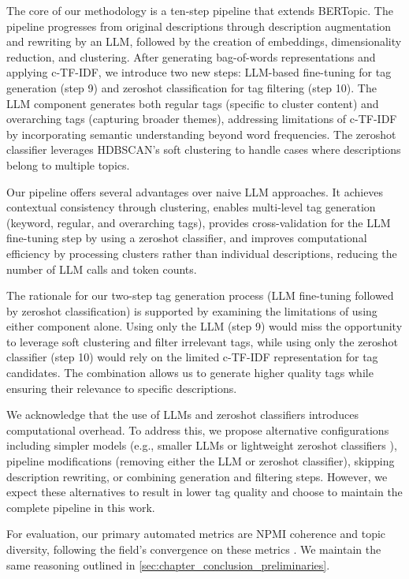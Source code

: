 The core of our methodology is a ten-step pipeline that extends BERTopic. The pipeline progresses from original descriptions through description augmentation and rewriting by an LLM, followed by the creation of embeddings, dimensionality reduction, and clustering. After generating bag-of-words representations and applying c-TF-IDF, we introduce two new steps: LLM-based fine-tuning for tag generation (step 9) and zeroshot classification for tag filtering (step 10). The LLM component generates both regular tags (specific to cluster content) and overarching tags (capturing broader themes), addressing limitations of c-TF-IDF by incorporating semantic understanding beyond word frequencies. The zeroshot classifier leverages HDBSCAN's soft clustering to handle cases where descriptions belong to multiple topics.

Our pipeline offers several advantages over naive LLM approaches. It achieves contextual consistency through clustering, enables multi-level tag generation (keyword, regular, and overarching tags), provides cross-validation for the LLM fine-tuning step by using a zeroshot classifier, and improves computational efficiency by processing clusters rather than individual descriptions, reducing the number of LLM calls and token counts.

The rationale for our two-step tag generation process (LLM fine-tuning followed by zeroshot classification) is supported by examining the limitations of using either component alone. Using only the LLM (step 9) would miss the opportunity to leverage soft clustering and filter irrelevant tags, while using only the zeroshot classifier (step 10) would rely on the limited c-TF-IDF representation for tag candidates. The combination allows us to generate higher quality tags while ensuring their relevance to specific descriptions.

We acknowledge that the use of LLMs and zeroshot classifiers introduces computational overhead. To address this, we propose alternative configurations including simpler models (e.g., smaller LLMs or lightweight zeroshot classifiers \cite{noauthor_moritzlaurerdeberta-v3-large-zeroshot-v20_2024}), pipeline modifications (removing either the LLM or zeroshot classifier), skipping description rewriting, or combining generation and filtering steps. However, we expect these alternatives to result in lower tag quality and choose to maintain the complete pipeline in this work.

For evaluation, our primary automated metrics are NPMI coherence and topic diversity, following the field's convergence on these metrics \cite{doogan_topic_2021, hoyle_is_2021, mimno_optimizing_nodate, lau_machine_2014}. We maintain the same reasoning outlined in \cref{sec:chapter_conclusion_preliminaries}.

